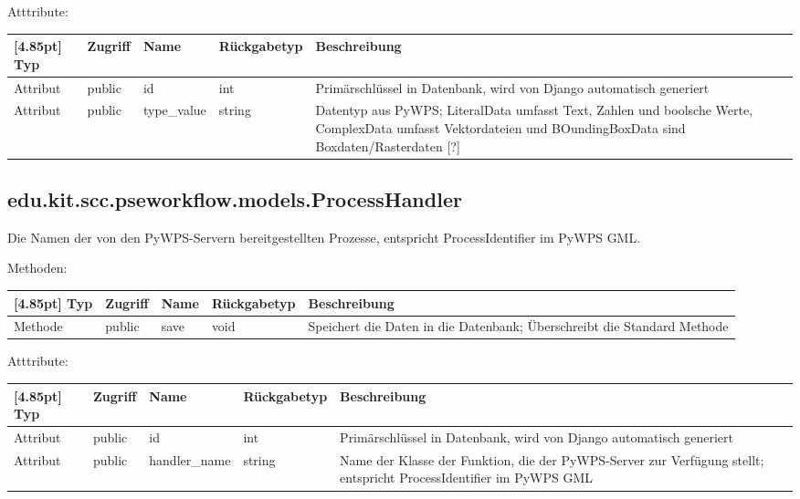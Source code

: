 			Atttribute:
			\begin{center}
				\setlength\tabcolsep{5pt}
				\renewcommand{\arraystretch}{1.5}
				
				\begin{tabularx}{\textwidth}{|l|l|l|l|X|}
					\hline
					\rowcolor[gray]{0.75}[4.85pt]
					Typ & Zugriff & Name & Rückgabetyp & Beschreibung \\ \hline 
					Attribut & public & id & int & Primärschlüssel in Datenbank, wird von Django automatisch generiert \\ \hline
					Attribut & public & type\_value & string & Datentyp aus PyWPS; LiteralData umfasst Text, Zahlen und boolsche Werte, ComplexData umfasst Vektordateien und BOundingBoxData sind Boxdaten/Rasterdaten [?] \\
					\hline
				\end{tabularx}
			\end{center}
		
		\subsection{edu.kit.scc.pseworkflow.models.ProcessHandler}
			Die Namen der von den PyWPS-Servern bereitgestellten Prozesse, entspricht ProcessIdentifier im PyWPS GML.
			
			Methoden:
			\begin{center}
				\setlength\tabcolsep{5pt}
				\renewcommand{\arraystretch}{1.5}
				
				\begin{tabularx}{\textwidth}{|l|l|l|l|X|}
					\hline
					\rowcolor[gray]{0.75}[4.85pt]
					Typ & Zugriff & Name & Rückgabetyp & Beschreibung \\ \hline 
					Methode & public & save & void & Speichert die Daten in die Datenbank; Überschreibt die Standard Methode \\ 
					\hline
				\end{tabularx}
			\end{center}
			
			Atttribute:
			\begin{center}
				\setlength\tabcolsep{5pt}
				\renewcommand{\arraystretch}{1.5}
				
				\begin{tabularx}{\textwidth}{|l|l|l|l|X|}
					\hline
					\rowcolor[gray]{0.75}[4.85pt]
					Typ & Zugriff & Name & Rückgabetyp & Beschreibung \\ \hline 
					Attribut & public & id & int & Primärschlüssel in Datenbank, wird von Django automatisch generiert \\ \hline
					Attribut & public & handler\_name & string & Name der Klasse der Funktion, die der PyWPS-Server zur Verfügung stellt; entspricht ProcessIdentifier im PyWPS GML \\
					\hline
				\end{tabularx}
			\end{center}
		
